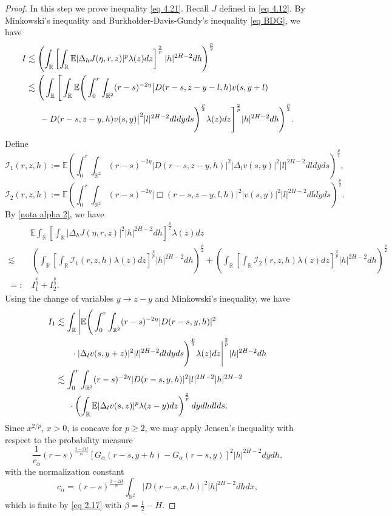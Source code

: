 \documentclass[11pt,reqno]{amsart}
\numberwithin{equation}{section}
\newcommand{\1}{{\bf 1}}
\newcommand{\2}{{\bf 2}}
\begin{document}
\begin{proof}
 In this step we prove   inequality \eqref{eq 4.21}. Recall  $J$ defined in   \eqref{eq 4.12}.   By Minkowski's inequality and    Burkholder-Davis-Gundy's inequality \eqref{eq BDG},  we have
\begin{align*}
I&\lesssim \left(\int_{\mathbb{R}}\left[\int_{\mathbb{R}}\mathbb{E}|\Delta_{h}J(\eta,r,z)|^p\lambda(z)dz\right]^{\frac2p}|h|^{2H-2}dh\right)^{\frac{p}2}\\
&\lesssim \Bigg(\int_{\mathbb{R}}\Bigg[\int_{\mathbb{R}}\mathbb{E}\Bigg(\int_0^r\int_{\mathbb{R}^2}(r-s)^{-2\eta}
\big|D(r-s,z-y-l,h)v(s,y+l)\\
&\hskip 12pt\,\, -D(r-s,z-y,h)v(s,y)\big|^2|l|^{2H-2}dldyds\Bigg)^{\frac{p}2}\lambda(z)dz\Bigg]^{\frac{2}{p}}|h|^{2H-2}dh\Bigg)^{\frac{p}2}.
\end{align*}
Define 
$$
\mathcal{I}_1(r,z,h):=\mathbb{E}\left(\int_0^r\int_{\mathbb{R}^2}(r-s)^{-2\eta}|D(r-s,z-y,h)|^2|\Delta_lv(s,y)|^2|l|^{2H-2}dldyds\right)^{\frac{p}{2}},
$$ 
$$
\mathcal{I}_2(r,z,h):=\mathbb{E}\left(\int_0^r\int_{\mathbb{R}^2}(r-s)^{-2\eta}|\Box(r-s,z-y,l,h)|^2| v(s,y)|^2|l|^{2H-2}dldyds\right)^{\frac{p}{2}}.
$$
By \eqref{nota alpha 2}, we have
\begin{align*}
&\mathbb{E}\int_{\mathbb{R}} \left[\int_{\mathbb{R}}|\Delta_{h}J(\eta,r,z)|^2|h|^{2H-2}dh\right]^{\frac{p}2}\lambda(z)dz\\
 \lesssim&\, \left(\int_{\mathbb{R}}\left[\int_{\mathbb{R}}\mathcal{I}_1(r,z,h)\lambda(z)dz\right]^{\frac{2}{p}}|h|^{2H-2}dh\right)^{\frac{p}2}+\left(\int_{\mathbb{R}}\left[\int_{\mathbb{R}}\mathcal{I}_2(r,z,h)\lambda(z)dz\right]^{\frac{2}{p}}|h|^{2H-2}dh\right)^{\frac{p}2}\\
=:&\, I_1^{\frac{p}2}+I_2^{\frac{p}2}.
\end{align*}
Using  the  change of variables $y\to z-y$ and   Minkowski's inequality, we have 
\begin{equation}\label{eq 4.22}
\begin{split}
I_1&\lesssim \int_{\mathbb R} \Bigg|\mathbb{E}\Bigg(\int_0^r\int_{\mathbb{R}^2}(r-s)^{-2\eta}|D(r-s,y,h)|^2 \\
&\hskip12pt \ \ \cdot |\Delta_lv(s,y+z)|^2|l|^{2H-2}dldyds\Bigg)^{\frac{p}{2}}\lambda(z)dz\Bigg|^{\frac{2}{p}}|h|^{2H-2}dh \\
&\lesssim \int_0^r\int_{\mathbb{R}^3}(r-s)^{-2\eta}|D(r-s,y,h)|^2|l|^{2H-2}|h|^{2H-2} \\
&\hskip12pt \,\,  \cdot\left(\int_{\mathbb{R}}\mathbb{E}|\Delta_lv(s,z)|^p\lambda(z-y)dz\right)^{\frac2p}dydhdlds.
\end{split}
\end{equation}
 Since $x^{2/p}$, $x>0$,  is   concave   for $p\ge2$, we  may  apply Jensen's inequality with respect to the probability measure
$$
\frac{1}{c_{\alpha}}(r-s)^{\frac{2-2H}{\alpha}} [G_{\alpha}(r-s,y+h)-G_{\alpha}(r-s,y)]^2|h|^{2H-2}dydh,
$$ 
with the  normalization constant
$$c_{\alpha}=(r-s)^{\frac{2-2H}{\alpha}}\int_{\mathbb{R}^2}|D(r-s,x,h)|^2|h|^{2H-2}dhdx, $$
which is finite  by \eqref{eq  2.17} with $\beta=\frac12-H$. 
 

\end{proof}
\end{document}
